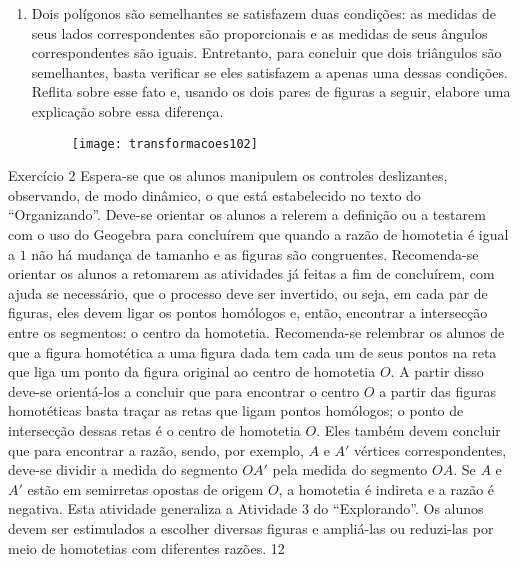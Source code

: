 \begin{enumerate}
\item Dois polígonos são semelhantes se satisfazem duas condições: as medidas de seus lados correspondentes são proporcionais e as medidas de seus ângulos correspondentes são iguais. Entretanto, para concluir que dois triângulos são semelhantes, basta verificar se eles satisfazem a apenas uma dessas condições. Reflita sobre esse fato e, usando os dois pares de figuras a seguir, elabore uma explicação sobre essa diferença.

 \begin{figure}[H]
\centering

\texttt{[image: transformacoes102]}
\end{figure}
\end{enumerate}
\clearpage
\begin{sugestions}{Exercício 2}
{
Espera-se que os alunos manipulem os controles deslizantes, observando, de modo dinâmico, o que está estabelecido no texto do “Organizando”. 
Deve-se orientar os alunos a relerem a definição ou a testarem com o uso do Geogebra para concluírem que quando a razão de homotetia é igual a $1$ não há mudança de tamanho e as figuras são congruentes.
Recomenda-se orientar os alunos a retomarem as atividades já feitas a fim de concluírem, com ajuda se necessário, que o processo deve ser invertido, ou seja, em cada par de figuras, eles devem ligar os pontos homólogos e, então, encontrar a intersecção entre os segmentos: o centro da homotetia. 
Recomenda-se relembrar os alunos de que a figura homotética a uma figura dada tem cada um de seus pontos na reta que liga um ponto da figura original ao centro de homotetia $O$. A partir disso deve-se orientá-los a concluir que para encontrar o centro $O$ a partir das figuras homotéticas basta traçar as retas que ligam pontos homólogos; o ponto de intersecção dessas retas é o centro de homotetia $O$. Eles também devem concluir que para encontrar a razão, sendo, por exemplo, $A$ e $A'$ vértices correspondentes, deve-se dividir a medida do segmento $OA'$ pela medida do segmento $OA$. Se $A$ e $A'$ estão em semirretas opostas de origem $O$, a homotetia é indireta e a razão é negativa.
Esta atividade generaliza a Atividade 3 do “Explorando”. Os alunos devem ser estimulados a escolher diversas figuras e ampliá-las ou reduzi-las por meio de homotetias com diferentes razões. 
}{1}{2}
\end{sugestions}
